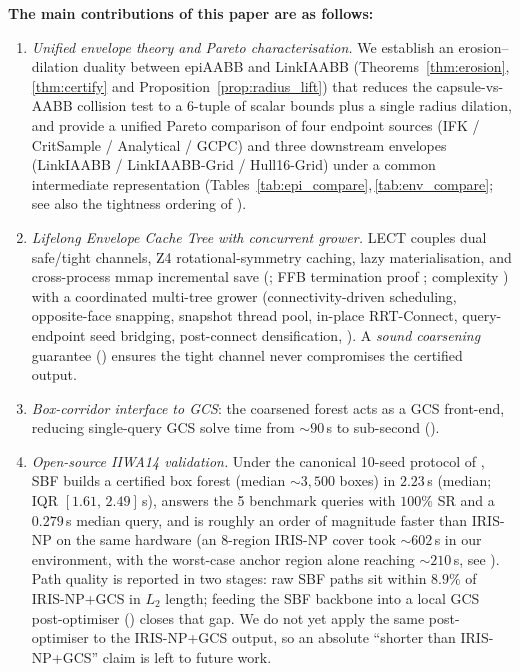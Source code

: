\documentclass[journal]{IEEEtran}
\begin{document}
\textbf{The main contributions of this paper are as follows:}
\begin{enumerate}[nosep]
  \item \emph{Unified envelope theory and Pareto characterisation.}
  We establish an erosion--dilation duality between epiAABB and
  LinkIAABB (Theorems~\ref{thm:erosion},\,\ref{thm:certify} and
  Proposition~\ref{prop:radius_lift}) that reduces the capsule-vs-AABB
  collision test to a 6-tuple of scalar bounds plus a single radius
  dilation, and provide a unified Pareto comparison of four endpoint
  sources (IFK / CritSample / Analytical / GCPC) and three downstream
  envelopes (LinkIAABB / LinkIAABB-Grid / Hull16-Grid) under a common
  intermediate representation (Tables~\ref{tab:epi_compare},\,\ref{tab:env_compare};
  see also the tightness ordering of ).

  \item \emph{Lifelong Envelope Cache Tree with concurrent grower.}
  LECT couples dual safe/tight channels, Z4 rotational-symmetry caching,
  lazy materialisation, and cross-process mmap incremental save
  (; FFB termination proof ;
  complexity ) with a coordinated multi-tree
  grower (connectivity-driven scheduling, opposite-face snapping,
  snapshot thread pool, in-place RRT-Connect, query-endpoint seed
  bridging, post-connect densification, ).
  A \emph{sound coarsening} guarantee () ensures
  the tight channel never compromises the certified output.

  \item \emph{Box-corridor interface to GCS}: the coarsened forest acts
  as a GCS front-end, reducing single-query GCS solve time from
  ${\sim}90$\,s to sub-second ().

  \item \emph{Open-source IIWA14 validation.}
  Under the canonical 10-seed protocol of
  , SBF builds a certified box forest
  (median ${\sim}3{,}500$ boxes) in $2.23$\,s (median; IQR
  $[1.61,\,2.49]$\,s), answers the 5 benchmark queries with $100\%$
  SR and a $0.279$\,s median query, and is roughly an order of
  magnitude faster than IRIS-NP on the same hardware (an 8-region
  IRIS-NP cover took ${\sim}602$\,s in our environment, with the
  worst-case anchor region alone reaching ${\sim}210$\,s, see
  ).
  Path quality is reported in two stages:
  raw SBF paths sit within $8.9\%$ of IRIS-NP+GCS in $L_2$ length;
  feeding the SBF backbone into a local GCS post-optimiser
  () closes that gap. We do not yet apply
  the same post-optimiser to the IRIS-NP+GCS output, so an absolute
  ``shorter than IRIS-NP+GCS'' claim is left to future work.
\end{enumerate}
\end{document}
